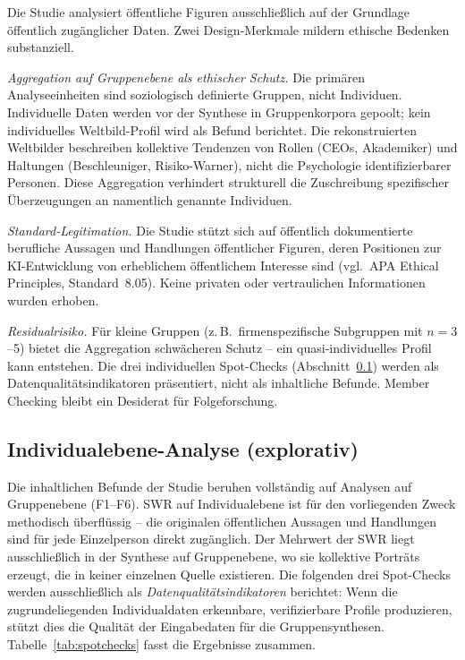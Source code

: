 \documentclass[12pt,a4paper]{article}
\begin{document}
Die Studie analysiert \"offentliche Figuren ausschlie\ss{}lich auf der Grundlage \"offentlich zug\"anglicher Daten. Zwei Design-Merkmale mildern ethische Bedenken substanziell.

\emph{Aggregation auf Gruppenebene als ethischer Schutz.} Die prim\"aren Analyseeinheiten sind soziologisch definierte Gruppen, nicht Individuen. Individuelle Daten werden vor der Synthese in Gruppenkorpora gepoolt; kein individuelles Weltbild-Profil wird als Befund berichtet. Die rekonstruierten Weltbilder beschreiben kollektive Tendenzen von Rollen (CEOs, Akademiker) und Haltungen (Beschleuniger, Risiko-Warner), nicht die Psychologie identifizierbarer Personen. Diese Aggregation verhindert strukturell die Zuschreibung spezifischer \"Uberzeugungen an namentlich genannte Individuen.

\emph{Standard-Legitimation.} Die Studie st\"utzt sich auf \"offentlich dokumentierte berufliche Aussagen und Handlungen \"offentlicher Figuren, deren Positionen zur KI-Entwicklung von erheblichem \"offentlichem Interesse sind (vgl.\ APA Ethical Principles, Standard~8.05). Keine privaten oder vertraulichen Informationen wurden erhoben.

\emph{Residualrisiko.} F\"ur kleine Gruppen (z.\,B.\ firmenspezifische Subgruppen mit $n = 3$--5) bietet die Aggregation schw\"acheren Schutz -- ein quasi-individuelles Profil kann entstehen. Die drei individuellen Spot-Checks (Abschnitt~\ref{sec:limitationen:spotchecks}) werden als Datenqualit\"atsindikatoren pr\"asentiert, nicht als inhaltliche Befunde. Member Checking \citep{SoysalTurkmen2024} bleibt ein Desiderat f\"ur Folgeforschung.


\subsection{Individualebene-Analyse (explorativ)}
\label{sec:limitationen:spotchecks}

Die inhaltlichen Befunde der Studie beruhen vollst\"andig auf Analysen auf Gruppenebene (F1--F6). SWR auf Individualebene ist f\"ur den vorliegenden Zweck methodisch \"uberfl\"ussig -- die originalen \"offentlichen Aussagen und Handlungen sind f\"ur jede Einzelperson direkt zug\"anglich. Der Mehrwert der SWR liegt ausschlie\ss{}lich in der Synthese auf Gruppenebene, wo sie kollektive Portr\"ats erzeugt, die in keiner einzelnen Quelle existieren. Die folgenden drei Spot-Checks werden ausschlie\ss{}lich als \emph{Datenqualit\"atsindikatoren} berichtet: Wenn die zugrundeliegenden Individualdaten erkennbare, verifizierbare Profile produzieren, st\"utzt dies die Qualit\"at der Eingabedaten f\"ur die Gruppensynthesen. Tabelle~\ref{tab:spotchecks} fasst die Ergebnisse zusammen.
\end{document}
